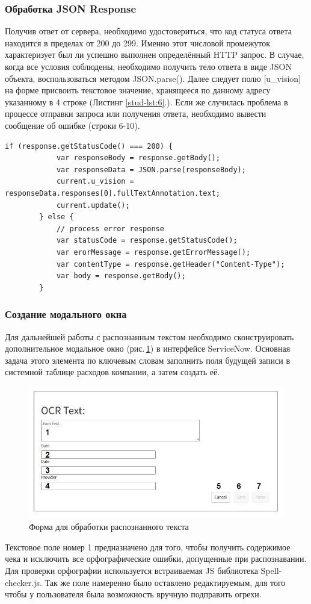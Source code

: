 \documentclass[14pt]{mmcs_article}
\begin{document}
\subsubsection{Обработка JSON Response}
Получив ответ от сервера, необходимо удостовериться, что код статуса ответа находится в пределах от 200 до 299. Именно этот числовой промежуток характеризует был ли успешно выполнен определённый HTTP запрос. В случае, когда все условия соблюдены, необходимо получить тело ответа в виде JSON объекта, воспользоваться методом JSON.parse(). Далее следует полю [u\_vision] на форме присвоить текстовое значение, хранящееся по данному адресу указанному в 4 строке (Листинг \ref{stud-lst:6}.). Если же случилась проблема в процессе отправки запроса или получения ответа, необходимо вывести сообщение об ошибке (строки 6-10).
\begin{lstlisting}[caption=JSON Request, label=stud-lst:6]
       if (response.getStatusCode() === 200) {
            var responseBody = response.getBody();
            var responseData = JSON.parse(responseBody);
            current.u_vision = responseData.responses[0].fullTextAnnotation.text;
            current.update();
        } else {
            // process error response
            var statusCode = response.getStatusCode();
            var erorMessage = response.getErrorMessage();
            var contentType = response.getHeader("Content-Type");
            var body = response.getBody();
        }
\end{lstlisting}
\subsubsection{Создание модального окна}
Для дальнейшей работы с распознанным текстом необходимо сконструировать дополнительное модальное окно (рис.\,\ref{stud:fig:123}) в интерфейсе Service\-Now. Основная задача этого элемента по ключевым словам заполнить поля будущей записи в системной таблице расходов компании, а затем создать её.
\begin{figure}[H]
  \centering
  \includegraphics[scale=0.5]{UI Page.png}
  \caption{Форма для обработки распознанного текста}\label{stud:fig:123}
\end{figure}
Текстовое поле номер 1 предназначено для того, чтобы получить содержимое чека и исключить все орфографические ошибки, допущенные при распознавании. Для проверки орфографии используется встраиваемая JS библиотека Spell-checker.js. Так же поле намеренно было оставлено редактируемым, для того чтобы у пользователя была возможность вручную подправить огрехи. 
\end{document}
